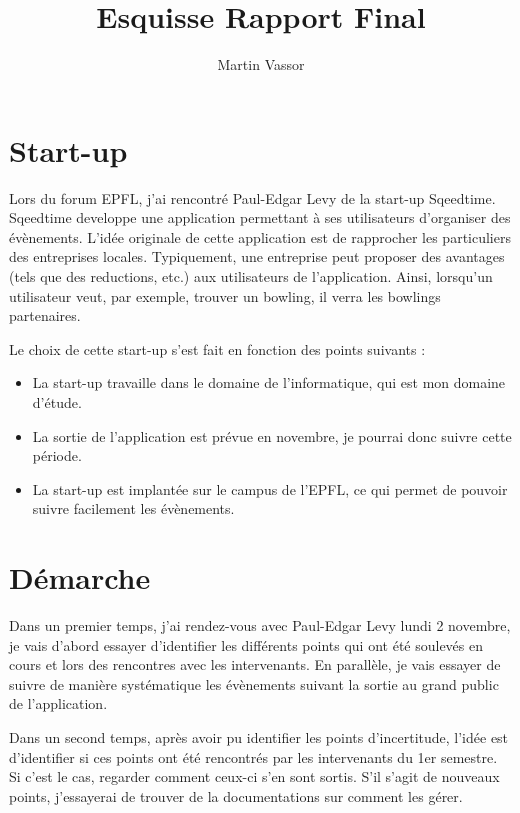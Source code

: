 \documentclass{article}
\title{Esquisse Rapport Final}
\author{Martin Vassor}
\begin{document}
\maketitle

\section{Start-up}

Lors du forum EPFL, j'ai rencontré Paul-Edgar Levy de la start-up Sqeedtime. Sqeedtime developpe une application permettant à ses utilisateurs d'organiser des évènements. L'idée originale de cette application est de rapprocher les particuliers des entreprises locales. Typiquement, une entreprise peut proposer des avantages (tels que des reductions, etc.) aux utilisateurs de l'application. Ainsi, lorsqu'un utilisateur veut, par exemple, trouver un bowling, il verra les bowlings partenaires. 

Le choix de cette start-up s'est fait en fonction des points suivants : 
\begin{itemize}
	\item La start-up travaille dans le domaine de l'informatique, qui est mon domaine d'étude.
	\item La sortie de l'application est prévue en novembre, je pourrai donc suivre cette période.
	\item La start-up est implantée sur le campus de l'EPFL, ce qui permet de pouvoir suivre facilement les évènements.
\end{itemize}


\section{Démarche}
Dans un premier temps, j'ai rendez-vous avec Paul-Edgar Levy lundi 2 novembre, je vais d'abord essayer d'identifier les différents points qui ont été soulevés en cours et lors des rencontres avec les intervenants. En parallèle, je vais essayer de suivre de manière systématique les évènements suivant la sortie au grand public de l'application.

Dans un second temps, après avoir pu identifier les points d'incertitude, l'idée est d'identifier si ces points ont été rencontrés par les intervenants du 1er semestre. Si c'est le cas, regarder comment ceux-ci s'en sont sortis. S'il s'agit de nouveaux points, j'essayerai de trouver de la documentations sur comment les gérer.
\end{document}
